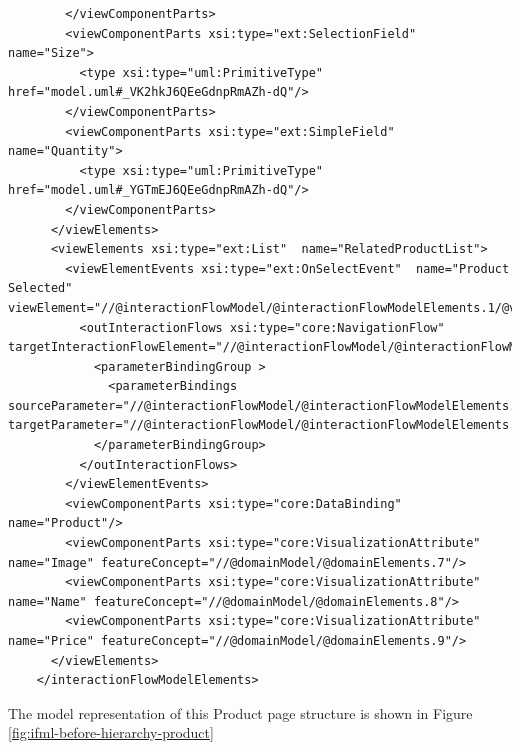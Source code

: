 \begin{lstlisting}
        </viewComponentParts>
        <viewComponentParts xsi:type="ext:SelectionField"  name="Size">
          <type xsi:type="uml:PrimitiveType" href="model.uml#_VK2hkJ6QEeGdnpRmAZh-dQ"/>
        </viewComponentParts>
        <viewComponentParts xsi:type="ext:SimpleField"  name="Quantity">
          <type xsi:type="uml:PrimitiveType" href="model.uml#_YGTmEJ6QEeGdnpRmAZh-dQ"/>
        </viewComponentParts>
      </viewElements>
      <viewElements xsi:type="ext:List"  name="RelatedProductList">
        <viewElementEvents xsi:type="ext:OnSelectEvent"  name="Product Selected" viewElement="//@interactionFlowModel/@interactionFlowModelElements.1/@viewElements.2">
          <outInteractionFlows xsi:type="core:NavigationFlow"  targetInteractionFlowElement="//@interactionFlowModel/@interactionFlowModelElements.1">
            <parameterBindingGroup >
              <parameterBindings  sourceParameter="//@interactionFlowModel/@interactionFlowModelElements.0/@viewElements.2/@parameters.0" targetParameter="//@interactionFlowModel/@interactionFlowModelElements.1/@parameters.0"/>
            </parameterBindingGroup>
          </outInteractionFlows>
        </viewElementEvents>
        <viewComponentParts xsi:type="core:DataBinding"  name="Product"/>
        <viewComponentParts xsi:type="core:VisualizationAttribute"  name="Image" featureConcept="//@domainModel/@domainElements.7"/>
        <viewComponentParts xsi:type="core:VisualizationAttribute"  name="Name" featureConcept="//@domainModel/@domainElements.8"/>
        <viewComponentParts xsi:type="core:VisualizationAttribute"  name="Price" featureConcept="//@domainModel/@domainElements.9"/>
      </viewElements>
    </interactionFlowModelElements>
\end{lstlisting}

\newpage
The model representation of this Product page structure is shown in Figure \ref{fig:ifml-before-hierarchy-product}

